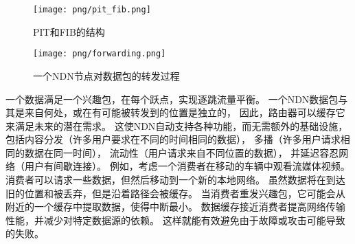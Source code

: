 \begin{figure}
\centering
\texttt{[image: png/pit\_fib.png]}
\caption{PIT和FIB的结构}
\label{mobility_pic}
\end{figure}

\begin{figure}
\centering
\texttt{[image: png/forwarding.png]}
\caption{一个NDN节点对数据包的转发过程}
\label{mobility_pic}
\end{figure}


一个数据满足一个兴趣包，在每个跃点，实现逐跳流量平衡。
一个NDN数据包与其是来自何处，或在有可能被转发到的位置是独立的，
因此，路由器可以缓存它来满足未来的潜在需求。
这使NDN自动支持各种功能，而无需额外的基础设施，
包括内容分发（许多用户要求在不同的时间相同的数据），
多播（许多用户请求相同的数据在同一时间），
流动性（用户请求来自不同位置的数据），
并延迟容忍网络（用户有间歇连接）。
例如，考虑一个消费者在移动的车辆中观看流媒体视频。
消费者可以请求一些数据，但然后移动到一个新的本地网络。
虽然数据将在到达旧的位置和被丢弃，但是沿着路径会被缓存。
当消费者重发兴趣包，它可能会从附近的一个缓存中提取数据，使得中断最小。
数据缓存接近消费者提高网络传输性能，并减少对特定数据源的依赖。
这样就能有效避免由于故障或攻击可能导致的失败。
